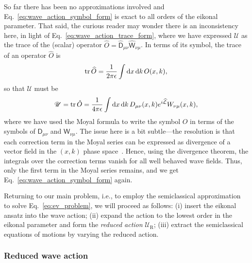 So far there has been no approximations involved and Eq.~\eqref{eq:wave_action_symbol_form} is exact to all orders of the eikonal parameter.
That said, the curious reader may wonder there is an inconsistency here, in light of Eq.~\eqref{eq:wave_action_trace_form}, where we have expressed $\mathscr{U}$ as the trace of the (scalar) operator $\widehat{O} = \widehat{\mathsf{D}}_{\mu\nu}\widehat{\mathsf{W}}_{\nu\mu}$.
In terms of its symbol, the trace of an operator $\widehat{O}$ is
%
\begin{equation}
  \operatorname{tr}\widehat{O} = \frac{1}{2\pi\epsilon} \int \mathrm{d}{x}\,\mathrm{d}{k}\, O(x, k),
\end{equation}
%
so that $\mathscr{U}$ must be
%
\begin{equation}
  \mathscr{U} = \operatorname{tr}{\hat{O}} = \frac{1}{4\pi\epsilon}\int \mathrm{d}{x}\,\mathrm{d}{k}\, D_{\mu\nu}(x,k)e^{i\widehat{\mathcal{L}}}W_{\nu\mu}(x, k),
\end{equation}
%
where we have used the Moyal formula to write the symbol $O$ in terms of the symbols of $\mathsf{D}_{\mu\nu}$ and $\mathsf{W}_{\nu\mu}$.
The issue here is a bit subtle---the resolution is that each correction term in the Moyal series can be expressed as divergence of a vector field in the $(x, k)$ phase space~\cite[Problem 3.16]{tracy2014}.
Hence, using the divergence theorem, the integrals over the correction terms vanish for all well behaved wave fields.
Thus, only the first term in the Moyal series remains, and we get Eq.~\eqref{eq:wave_action_symbol_form} again.

Returning to our main problem, i.e., to employ the semiclassical approximation to solve Eq.~\eqref{eq:ev_problem}, we will proceed as follows: (i) insert the eikonal ansatz into the wave action; (ii) expand the action to the lowest order in the eikonal parameter and form the \emph{reduced action} $\mathscr{U}_{\text{R}}$; (iii) extract the semiclassical equations of motions by varying the reduced action.

\subsubsection*{Reduced wave action}

